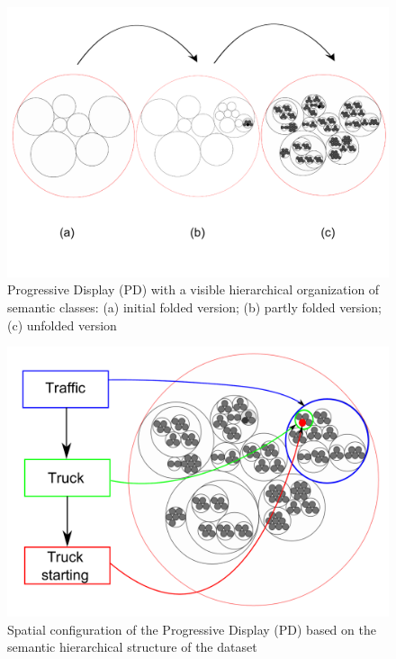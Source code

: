 \documentclass{aes2e}
\begin{document}
\begin{figure}[t]
\begin{center}
\includegraphics[scale=0.4]{gfx/XP1clean2.pdf} 
\end{center}
\caption{\label{figXP1} Progressive Display (PD) with a  visible hierarchical organization of semantic classes: (a) initial folded version; (b) partly folded version; (c) unfolded version}
\end{figure}

\begin{figure}[t]
\begin{center}
\includegraphics[scale=0.24]{gfx/SSF.pdf} 
\end{center}
\caption{\label{figSSF} Spatial configuration of the Progressive Display (PD) based on the semantic hierarchical structure of the dataset}
\end{figure}
\end{document}
